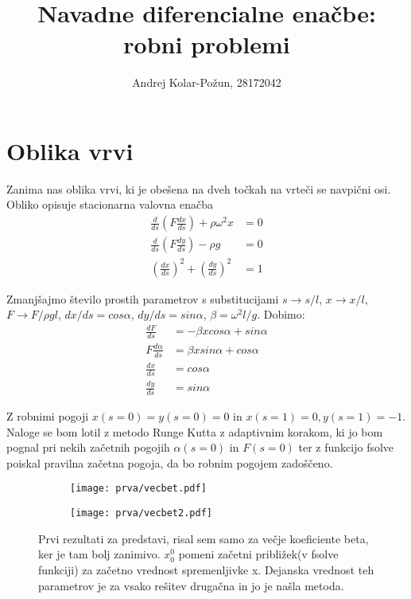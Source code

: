 \documentclass{article}
\title{Navadne diferencialne enačbe: robni problemi}
\author{Andrej Kolar-Požun, 28172042}
\begin{document}
\maketitle
\newpage
{}
\section{Oblika vrvi}

Zanima nas oblika vrvi, ki je obešena na dveh točkah na vrteči se navpični osi.
Obliko opisuje stacionarna valovna enačba
\begin{align*}
\frac{d}{ds}\left( F \frac{dx}{ds}\right) + \rho \omega^2 x &= 0 \\
\frac{d}{ds}\left( F \frac{dy}{ds}\right) - \rho g &= 0 \\
\left( \frac{dx}{ds}\right) ^2 + \left( \frac{dy}{ds}\right) ^2 &= 1
\end{align*}

Zmanjšajmo število prostih parametrov s substitucijami $s \rightarrow s/l$, $x \rightarrow x/l$, $F \rightarrow F/\rho g l$, $dx/ds = cos \alpha$, $dy/ds = sin \alpha$, $\beta = \omega^2 l /g$. Dobimo:
\begin{align*}
\frac{dF}{ds} &= - \beta x cos \alpha +  sin \alpha \\
F \frac{d \alpha}{ds} &=  \beta x sin \alpha + cos \alpha \\
\frac{dx}{ds} & = cos \alpha \\
\frac{dy}{ds} &= sin \alpha
\end{align*}

Z robnimi pogoji $x(s=0) = y(s=0) = 0$ in $x(s=1) = 0, y(s=1) = -1$. Naloge se bom lotil z metodo Runge Kutta z adaptivnim korakom, ki jo bom pognal pri nekih začetnih pogojih $\alpha(s=0)$ in $F(s=0)$ ter z funkcijo fsolve poiskal pravilna začetna pogoja, da bo robnim pogojem zadoščeno. 

\begin{figure}[H]
\centering
\begin{subfigure}{.49\textwidth}
\texttt{[image: prva/vecbet.pdf]}
\end{subfigure}
\begin{subfigure}{.49\textwidth}
\texttt{[image: prva/vecbet2.pdf]}
\end{subfigure}
\caption*{Prvi rezultati za predstavi, risal sem samo za večje koeficiente beta, ker je tam bolj zanimivo. $x_0^0$ pomeni začetni približek(v fsolve funkciji) za začetno vrednost spremenljivke x. Dejanska vrednost teh parametrov je za vsako rešitev drugačna in jo je našla metoda.}
\end{figure}
\end{document}
